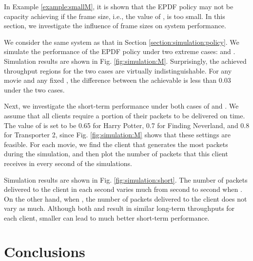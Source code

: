 \documentclass[10pt,nocopyrightspace]{sigplan-proc-varsize-1in}
\begin{document}
In Example \ref{example:smallM}, it is shown that the EPDF policy may not be capacity achieving if the frame size, i.e., the value of , is too small. In this section, we investigate the influence of frame sizes on system performance.

We consider the same system as that in Section \ref{section:simulation:policy}. We simulate the performance of the EPDF policy under two extreme cases:  and . Simulation results are shown in Fig. \ref{fig:simulation:M}. Surprisingly, the achieved throughput regions for the two cases are virtually indistinguishable. For any movie and any fixed , the difference between the achievable  is less than 0.03 under the two cases.

Next, we investigate the short-term performance under both cases of  and . We assume that all clients require a portion  of their packets to be delivered on time. The value of  is set to be 0.65 for Harry Potter, 0.7 for Finding Neverland, and 0.8 for Transporter 2, since Fig. \ref{fig:simulation:M} shows that these settings are feasible. For each movie, we find the client that generates the most packets during the simulation, and then plot the number of packets that this client receives in every second of the simulations.

Simulation results are shown in Fig. \ref{fig:simulation:short}. The number of packets delivered to the client in each second varies much from second to second when . On the other hand, when , the number of packets delivered to the client does not vary as much. Although both  and  result in similar long-term throughputs for each client, smaller  can lead to much better short-term performance.

\begin{figure*}[t]
\hspace{0.01\linewidth} 
\hspace{0.01\linewidth} 
\caption{Achieved throughput regions for different frame sizes.}\label{fig:simulation:short}
\end{figure*}

\section{Conclusions}	\label{section:conclusions}
\end{document}
